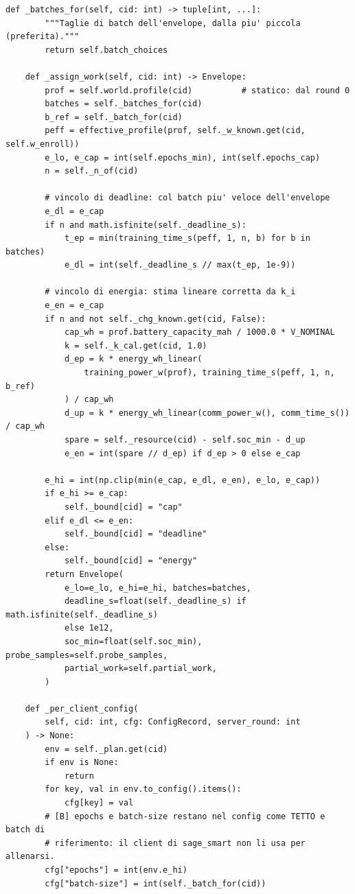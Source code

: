 \documentclass[11pt,a4paper]{article}
\begin{document}
\begin{lstlisting}[style=py,firstnumber=705,caption={\texttt{tesifl/strategies/sage\_smart.py}, lines 705--774}]
    def _batches_for(self, cid: int) -> tuple[int, ...]:
        """Taglie di batch dell'envelope, dalla piu' piccola (preferita)."""
        return self.batch_choices

    def _assign_work(self, cid: int) -> Envelope:
        prof = self.world.profile(cid)          # statico: dal round 0
        batches = self._batches_for(cid)
        b_ref = self._batch_for(cid)
        peff = effective_profile(prof, self._w_known.get(cid, self.w_enroll))
        e_lo, e_cap = int(self.epochs_min), int(self.epochs_cap)
        n = self._n_of(cid)

        # vincolo di deadline: col batch piu' veloce dell'envelope
        e_dl = e_cap
        if n and math.isfinite(self._deadline_s):
            t_ep = min(training_time_s(peff, 1, n, b) for b in batches)
            e_dl = int(self._deadline_s // max(t_ep, 1e-9))

        # vincolo di energia: stima lineare corretta da k_i
        e_en = e_cap
        if n and not self._chg_known.get(cid, False):
            cap_wh = prof.battery_capacity_mah / 1000.0 * V_NOMINAL
            k = self._k_cal.get(cid, 1.0)
            d_ep = k * energy_wh_linear(
                training_power_w(prof), training_time_s(peff, 1, n, b_ref)
            ) / cap_wh
            d_up = k * energy_wh_linear(comm_power_w(), comm_time_s()) / cap_wh
            spare = self._resource(cid) - self.soc_min - d_up
            e_en = int(spare // d_ep) if d_ep > 0 else e_cap

        e_hi = int(np.clip(min(e_cap, e_dl, e_en), e_lo, e_cap))
        if e_hi >= e_cap:
            self._bound[cid] = "cap"
        elif e_dl <= e_en:
            self._bound[cid] = "deadline"
        else:
            self._bound[cid] = "energy"
        return Envelope(
            e_lo=e_lo, e_hi=e_hi, batches=batches,
            deadline_s=float(self._deadline_s) if math.isfinite(self._deadline_s)
            else 1e12,
            soc_min=float(self.soc_min), probe_samples=self.probe_samples,
            partial_work=self.partial_work,
        )

    def _per_client_config(
        self, cid: int, cfg: ConfigRecord, server_round: int
    ) -> None:
        env = self._plan.get(cid)
        if env is None:
            return
        for key, val in env.to_config().items():
            cfg[key] = val
        # [B] epochs e batch-size restano nel config come TETTO e batch di
        # riferimento: il client di sage_smart non li usa per allenarsi.
        cfg["epochs"] = int(env.e_hi)
        cfg["batch-size"] = int(self._batch_for(cid))


\end{lstlisting}
\end{document}
